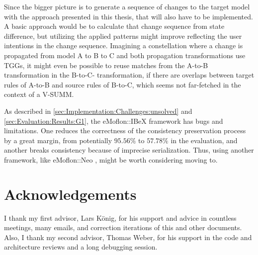 Since the bigger picture is to generate a sequence of changes to the target model with the approach presented in this thesis, that will also have to be implemented. A basic approach would be to calculate that change sequence from state difference, but utilizing the applied patterns might improve reflecting the user intentions in the change sequence.
Imagining a constellation where a change is propagated from model A to B to C and both propagation transformations use TGGs, it might even be possible to reuse matches from the A-to-B transformation in the B-to-C- transformation, if there are overlaps between target rules of A-to-B and source rules of B-to-C, which seems not far-fetched in the context of a V-SUMM.

As described in \autoref{sec:Implementation:Challenges:unsolved} and \autoref{sec:Evaluation:Results:G1}, the eMoflon::IBeX framework has bugs and limitations. One reduces the correctness of the consistency preservation process by a great margin, from potentially $95.56\%$ to $57.78\%$ in the evaluation, and another breaks consistency because of imprecise serialization. Thus, using another framework, like eMoflon::Neo \cite{weidmann_emoflonneo_nodate}, might be worth considering moving to.

\section{Acknowledgements}
I thank my first advisor, Lars König, for his support and advice in countless meetings, many emails, and correction iterations of this and other documents.
Also, I thank my second advisor, Thomas Weber, for his support in the code and architecture reviews and a long debugging session.